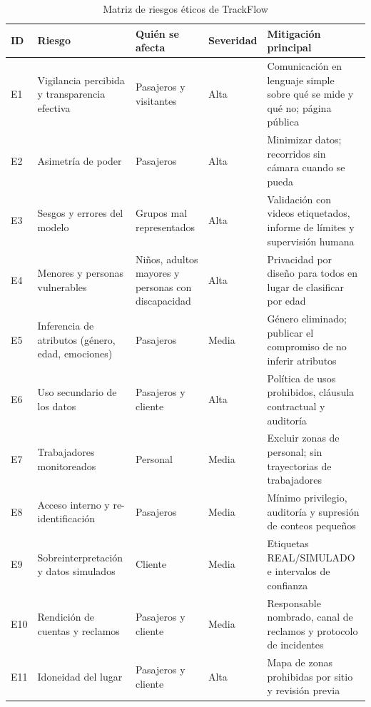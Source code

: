 \documentclass[12pt,a4paper]{article}
\begin{document}
\begin{table}[!htbp]
\centering
\caption{Matriz de riesgos éticos de TrackFlow}
\label{tab:matriz-etica}
\footnotesize
\renewcommand{\arraystretch}{1.15}
\begin{tabular}{|L{0.05\textwidth}|L{0.23\textwidth}|L{0.20\textwidth}|L{0.09\textwidth}|L{0.28\textwidth}|}
\hline
\textbf{ID} & \textbf{Riesgo} & \textbf{Quién se afecta} & \textbf{Severidad} & \textbf{Mitigación principal} \\
\hline
E1 & Vigilancia percibida y transparencia efectiva & Pasajeros y visitantes & Alta & Comunicación en lenguaje simple sobre qué se mide y qué no; página pública \\
\hline
E2 & Asimetría de poder & Pasajeros & Alta & Minimizar datos; recorridos sin cámara cuando se pueda \\
\hline
E3 & Sesgos y errores del modelo & Grupos mal representados & Alta & Validación con videos etiquetados, informe de límites y supervisión humana \\
\hline
E4 & Menores y personas vulnerables & Niños, adultos mayores y personas con discapacidad & Alta & Privacidad por diseño para todos en lugar de clasificar por edad \\
\hline
E5 & Inferencia de atributos (género, edad, emociones) & Pasajeros & Media & Género eliminado; publicar el compromiso de no inferir atributos \\
\hline
E6 & Uso secundario de los datos & Pasajeros y cliente & Alta & Política de usos prohibidos, cláusula contractual y auditoría \\
\hline
E7 & Trabajadores monitoreados & Personal & Media & Excluir zonas de personal; sin trayectorias de trabajadores \\
\hline
E8 & Acceso interno y re-identificación & Pasajeros & Media & Mínimo privilegio, auditoría y supresión de conteos pequeños \\
\hline
E9 & Sobreinterpretación y datos simulados & Cliente & Media & Etiquetas REAL/SIMULADO e intervalos de confianza \\
\hline
E10 & Rendición de cuentas y reclamos & Pasajeros y cliente & Media & Responsable nombrado, canal de reclamos y protocolo de incidentes \\
\hline
E11 & Idoneidad del lugar & Pasajeros y cliente & Alta & Mapa de zonas prohibidas por sitio y revisión previa \\
\hline
\end{tabular}
\end{table}
\end{document}
